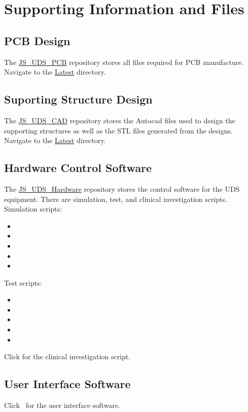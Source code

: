 \section{Supporting Information and Files}

\subsection{PCB Design}

The \href{https://github.com/M-JEFFRYES/JS_UDS_PCB}{JS\_UDS\_PCB} repository stores all files required for PCB manufacture. Navigate to the \href{https://github.com/M-JEFFRYES/JS_UDS_PCB/tree/main/Latest}{Latest} directory. 

\subsection{Suporting Structure Design}

The \href{https://github.com/M-JEFFRYES/JS_UDS_CAD}{JS\_UDS\_CAD} repository stores the Autocad files used to design the supporting structures as well as the STL files generated from the designs. Navigate to the \href{https://github.com/M-JEFFRYES/JS_UDS_CAD/tree/main/Latest}{Latest} directory.

\subsection{Hardware Control Software}

The \href{https://github.com/M-JEFFRYES/JS_UDS_Hardware}{JS\_UDS\_Hardware} repository stores the control software for the UDS equipment. There are simulation, test, and clinical investigation scripts. \\

Simulation scripts:
\begin{itemize}
    \item \pressuresimrepo
    \item \pumpsimrepo
    \item \visimrepo
    \item \vvsimrepo
    \item \investigationsimrepo
\end{itemize}


Test scripts:
\begin{itemize}
    \item \pressuretestrepo
    \item \pumptestrepo
    \item \vitestrepo
    \item \vvtestrepo
    \item \investigationtestrepo
\end{itemize}

Click \fullclinicalrepo for the clinical investigation script.

\subsection{User Interface Software}
Click \uiswrepo \ for the user interface software.

\clearpage